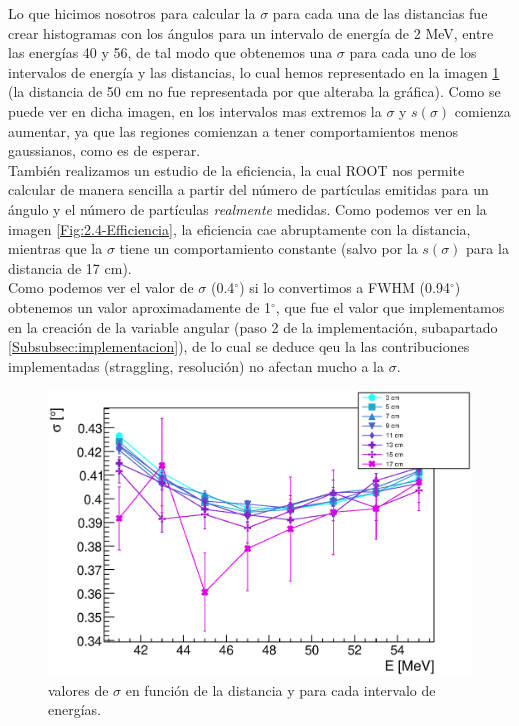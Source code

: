\documentclass[12pt,a4paper]{article}
\numberwithin{equation}{section}
\numberwithin{figure}{section}
\begin{document}
Lo que hicimos nosotros para calcular la $\sigma$ para cada una de las distancias fue crear histogramas con los ángulos para un intervalo de energía de 2 MeV, entre las energías 40 y 56, de tal modo que obtenemos una $\sigma$ para cada uno de los intervalos de energía y las distancias, lo cual hemos representado en la imagen \ref{Fig:2.4-sigma} (la distancia de 50 cm no fue representada por que alteraba la gráfica). Como se puede ver en dicha imagen, en los intervalos mas extremos la $\sigma$ y $s(\sigma)$ comienza aumentar, ya que las regiones comienzan a tener comportamientos menos gaussianos, como es de esperar.  \\

También realizamos un estudio de la eficiencia, la cual ROOT nos permite calcular de manera sencilla a partir del número de partículas emitidas para un ángulo y el número de partículas {\it realmente} medidas. Como podemos ver en la imagen \ref{Fig:2.4-Efficiencia}, la eficiencia cae abruptamente con la distancia, mientras que la $\sigma$ tiene un comportamiento constante (salvo por la  $s(\sigma)$ para la distancia de 17 cm). \\

Como podemos ver el valor de $\sigma$ (0.4$^\circ$) si lo convertimos a FWHM (0.94$^\circ$) obtenemos un valor aproximadamente de 1$^\circ$, que fue el valor que implementamos en la creación de la variable angular (paso 2 de la implementación, subapartado \ref{Subsubsec:implementacion}), de lo cual se deduce qeu la las contribuciones implementadas (straggling, resolución) no afectan mucho a la $\sigma$. 




\begin{figure}[h!] \centering
    \includegraphics[scale=0.8]{sigma.eps}
    \caption{valores de $\sigma$ en función de la distancia y para cada intervalo de energías.}
    \label{Fig:2.4-sigma}
\end{figure}
\end{document}
